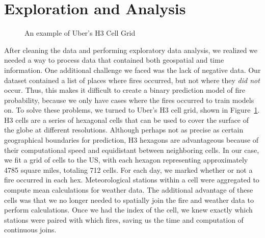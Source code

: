 \documentclass[
  12pt,
  letterpaper,
  DIV=11,
  numbers=noendperiod]{scrartcl}
\begin{document}
\section{Exploration and Analysis}\label{exploration-and-analysis}

\begin{figure}[H]


\caption{\label{fig-UberH3}An example of Uber's H3 Cell Grid}

\end{figure}%

After cleaning the data and performing exploratory data analysis, we
realized we needed a way to process data that contained both geospatial
and time information. One additional challenge we faced was the lack of
negative data. Our dataset contained a list of places where fires
occurred, but not where they \emph{did not} occur. Thus, this makes it
difficult to create a binary prediction model of fire probability,
because we only have cases where the fires occurred to train models on.
To solve these problems, we turned to Uber's H3 cell grid, shown in
Figure~\ref{fig-UberH3}. H3 cells are a series of hexagonal cells that
can be used to cover the surface of the globe at different resolutions.
Although perhaps not as precise as certain geographical boundaries for
prediction, H3 hexagons are advantageous because of their computational
speed and equidistant between neighboring cells. In our case, we fit a
grid of cells to the US, with each hexagon representing approximately
4785 square miles, totaling 712 cells. For each day, we marked whether
or not a fire occurred in each hex. Meteorological stations within a
cell were aggregated to compute mean calculations for weather data. The
additional advantage of these cells was that we no longer needed to
spatially join the fire and weather data to perform calculations. Once
we had the index of the cell, we knew exactly which stations were paired
with which fires, saving us the time and computation of continuous
joins.
\end{document}
